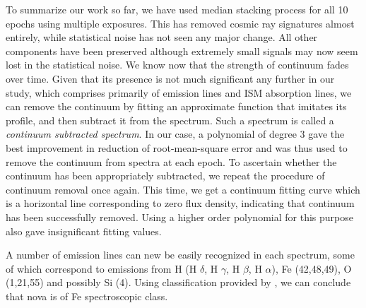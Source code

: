 \documentclass{tda}
\begin{document}
	To summarize our work so far, we have used median stacking process for all 10 epochs using multiple exposures. This has removed cosmic ray signatures almost entirely, while statistical noise has not seen any major change. All other components have been preserved although extremely small signals may now seem lost in the statistical noise. We know now that the strength of continuum fades over time. Given that its presence is not much significant any further in our study, which comprises primarily of emission lines and ISM absorption lines, we can remove the continuum by fitting an approximate function that imitates its profile, and then subtract it from the spectrum. Such a spectrum is called a \emph{continuum subtracted spectrum}. In our case, a polynomial of degree 3 gave the best improvement in reduction of root-mean-square error and was thus used to remove the continuum from spectra at each epoch. To ascertain whether the continuum has been appropriately subtracted, we repeat the procedure of continuum removal once again. This time, we get a continuum fitting curve which is a horizontal line corresponding to zero flux density, indicating that continuum has been successfully removed. Using a higher order polynomial for this purpose also gave insignificant fitting values.

	A number of emission lines can new be easily recognized in each spectrum, some of which correspond to emissions from H \textsc{} (H \textsc{\(\delta\)}, H \textsc{\(\gamma\)}, H \textsc{\(\beta\)}, H \textsc{\(\alpha\)}), Fe \textsc{} (42,48,49), O \textsc{} (1,21,55) and possibly Si \textsc{} (4). Using classification provided by \citet{2012AJ....144...98W}, we can conclude that nova is of Fe \textsc{} spectroscopic class.
\end{document}
